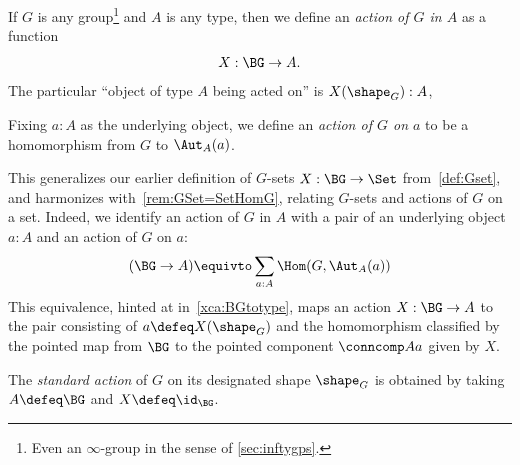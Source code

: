 \begin{definition}\label{def:action}
  If $G$ is any group\footnote{%
  Even an $\infty$-group in the sense of \cref{sec:inftygps}.}
  and $A$ is any type,
  then we define an \emph{action of $G$ in $A$} as a function
  \[
    X : \BG \to A.
  \]
  The particular ``object of type $A$ being acted on'' is $X(\sh_G):A$,

  Fixing $a:A$ as the underlying object, 
  we define an \emph{action of $G$ on $a$}
  to be a homomorphism from $G$ to $\Aut_A(a)$.%
\end{definition}
This generalizes our earlier definition of $G$-sets $X : \BG \to \Set$
from~\cref{def:Gset},
and harmonizes with~\cref{rem:GSet=SetHomG}, relating $G$-sets and
actions of $G$ on a set.
Indeed, we identify
an action of $G$ in $A$ with a pair of an underlying object
$a:A$ and an action of $G$ on $a$:
\[
  (\BG \to A) \equivto \sum_{a:A}\Hom(G,\Aut_A(a))
\]
This equivalence,
hinted at in~\cref{xca:BGtotype},
maps an action $X:\BG\to A$
to the pair consisting of $a \defeq X(\sh_G)$
and the homomorphism classified by the pointed map
from $\BG$ to the pointed component $\conncomp A a$ given by $X$.

\begin{definition}\label{std-action}
  The \emph{standard action} of $G$ on its designated shape $\sh_G$ is obtained by
  taking $A \defeq \BG$ and $X \defeq \id_{\BG}$.
\end{definition}

